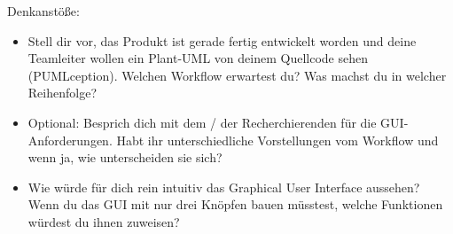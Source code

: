 Denkanstöße:
\begin{itemize}
\item Stell dir vor, das Produkt ist gerade fertig entwickelt worden und deine Teamleiter wollen ein Plant-UML von deinem Quellcode sehen (PUMLception). Welchen Workflow erwartest du? Was machst du in welcher Reihenfolge?
\item Optional: Besprich dich mit dem / der Recherchierenden für die GUI-Anforderungen. Habt ihr unterschiedliche Vorstellungen vom Workflow und wenn ja, wie unterscheiden sie sich?
\item Wie würde für dich rein intuitiv das Graphical User Interface aussehen? Wenn du das GUI mit nur drei Knöpfen bauen müsstest, welche Funktionen würdest du ihnen zuweisen?
\end{itemize}
\nsecend